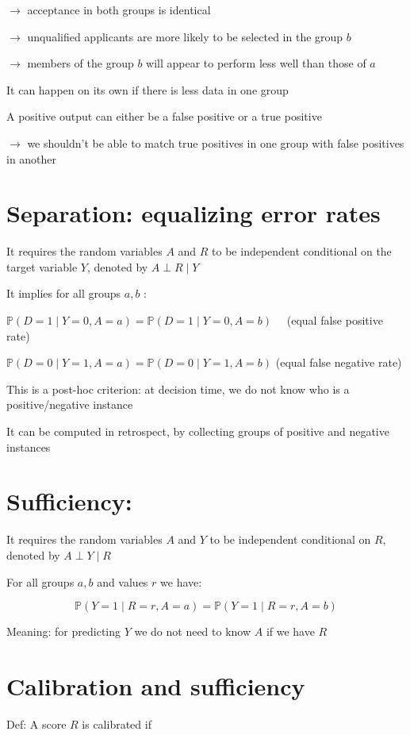 \documentclass[10pt]{article}
\begin{document}
$\rightarrow$ acceptance in both groups is identical

$\rightarrow$ unqualified applicants are more likely to be selected in the group $b$

$\rightarrow$ members of the group $b$ will appear to perform less well than those of $a$

It can happen on its own if there is less data in one group

A positive output can either be a false positive or a true positive

$\rightarrow$ we shouldn't be able to match true positives in one group with false positives in another

\section*{Separation: equalizing error rates}
It requires the random variables $A$ and $R$ to be independent conditional on the target variable $Y$, denoted by $A \perp R \mid Y$

It implies for all groups $a, b$ :

$\mathbb{P}(D=1 \mid Y=0, A=a)=\mathbb{P}(D=1 \mid Y=0, A=b) \quad$ (equal false positive rate)

$\mathbb{P}(D=0 \mid Y=1, A=a)=\mathbb{P}(D=0 \mid Y=1, A=b)$ (equal false negative rate)

This is a post-hoc criterion: at decision time, we do not know who is a positive/negative instance

It can be computed in retrospect, by collecting groups of positive and negative instances

\section*{Sufficiency:}
It requires the random variables $A$ and $Y$ to be independent conditional on $R$, denoted by $A \perp Y \mid R$

For all groups $a, b$ and values $r$ we have:

$$
\mathbb{P}(Y=1 \mid R=r, A=a)=\mathbb{P}(Y=1 \mid R=r, A=b)
$$

Meaning: for predicting $Y$ we do not need to know $A$ if we have $R$

\section*{Calibration and sufficiency}
Def: A score $R$ is calibrated if
\end{document}
